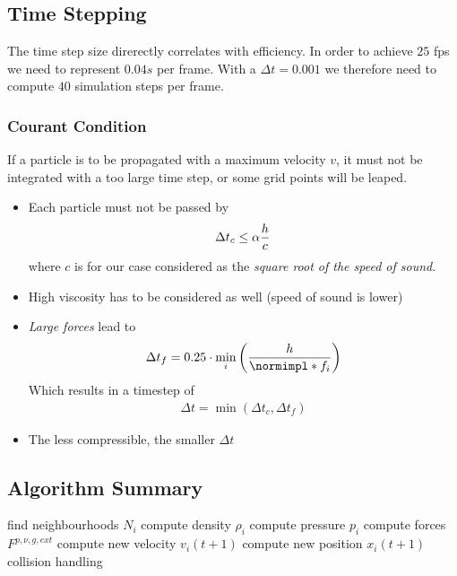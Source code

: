 \begin{multicols}{2}
\subsection{Time Stepping}
The time step size direrectly correlates with efficiency. In order to achieve $25$ fps we need to represent $0.04s$ per frame. With a $\Delta t=0.001$ we therefore need to compute $40$ simulation steps per frame. 

\subsubsection{Courant Condition}
If a particle is to be propagated with a maximum velocity $v$, it must not be integrated with a too large time step, or some grid points will be leaped. 
\begin{itemize}
	\item Each particle must not be passed by
		\begin{align*}
			\Delta t_c \leq \alpha {h\over c}
		\end{align*}
		where $c$ is for our case considered as the \emph{square root of the speed of sound}.
	\item High viscosity has to be considered as well (speed of sound is lower)
	\item \emph{Large forces} lead to 
		\begin{align*}
			\Delta t_f = 0.25 \cdot \min_i \left( {h\over \norm{f_i} } \right)
		\end{align*}
		Which results in a timestep of 
		\begin{align*}
			\Delta t = \min\left( \Delta t_c, \Delta t_f \right)
		\end{align*}
	\item The less compressible, the smaller $\Delta t$
\end{itemize}


\subsection{Algorithm Summary}

\begin{algorithmic}
		\STATE find neighbourhoods $N_i$
	\ENDFOR
		\STATE compute density $\rho_i$
		\STATE compute pressure $p_i$
	\ENDFOR
		\STATE compute forces $F^{p, \nu, g, ext}$
	\ENDFOR
		\STATE compute new velocity $v_i(t+1)$
		\STATE compute new position $x_i(t+1)$
		\STATE collision handling
	\ENDFOR
\ENDWHILE
\end{algorithmic}


\end{multicols}
